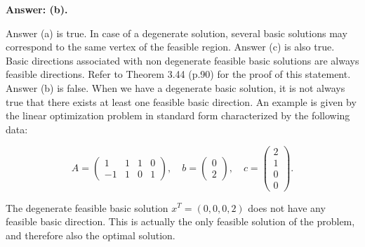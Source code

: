  {\bf Answer: (b).}

Answer (a) is true. In case of a degenerate solution, several basic solutions may correspond to the same vertex of the feasible region.
Answer (c) is also true. Basic directions associated with non degenerate feasible basic solutions are always feasible directions. Refer to Theorem 3.44 (p.90) for the proof of this statement. Answer (b) is false. When we have a degenerate basic solution, it is not always true that there exists at least one feasible basic direction.
An example is given by the linear optimization problem in standard
form characterized by the following data:

$$ A=
\begin{pmatrix}
1 & 1 & 1 & 0\\
-1 & 1 & 0 & 1
\end{pmatrix}, \quad
b=
\begin{pmatrix}
0\\
2
\end{pmatrix}, \quad
c=
\begin{pmatrix}
2\\
1\\
0\\
0
\end{pmatrix}.$$

The degenerate feasible basic solution $x^T = (0, 0, 0, 2)$ does not
have any feasible basic direction. This is actually the only feasible solution of the problem, and therefore also the optimal solution.

